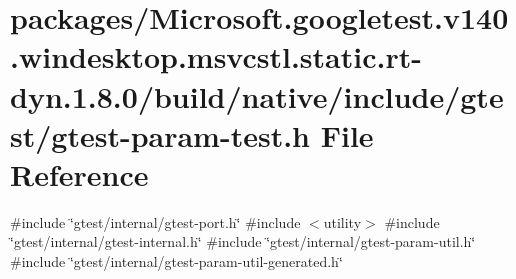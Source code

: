 \hypertarget{gtest-param-test_8h}{}\section{packages/\+Microsoft.googletest.\+v140.\+windesktop.\+msvcstl.\+static.\+rt-\/dyn.1.8.0/build/native/include/gtest/gtest-\/param-\/test.h File Reference}
\label{gtest-param-test_8h}
{\ttfamily \#include \char`\"{}gtest/internal/gtest-\/port.\+h\char`\"{}}\newline
{\ttfamily \#include $<$utility$>$}\newline
{\ttfamily \#include \char`\"{}gtest/internal/gtest-\/internal.\+h\char`\"{}}\newline
{\ttfamily \#include \char`\"{}gtest/internal/gtest-\/param-\/util.\+h\char`\"{}}\newline
{\ttfamily \#include \char`\"{}gtest/internal/gtest-\/param-\/util-\/generated.\+h\char`\"{}}\newline
